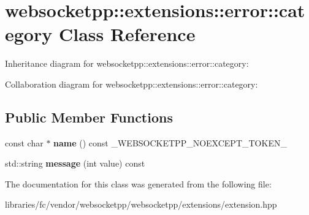 \hypertarget{classwebsocketpp_1_1extensions_1_1error_1_1category}{}\section{websocketpp\+:\+:extensions\+:\+:error\+:\+:category Class Reference}
\label{classwebsocketpp_1_1extensions_1_1error_1_1category}


Inheritance diagram for websocketpp\+:\+:extensions\+:\+:error\+:\+:category\+:


Collaboration diagram for websocketpp\+:\+:extensions\+:\+:error\+:\+:category\+:
\subsection*{Public Member Functions}
\begin{DoxyCompactItemize}
\item 
\mbox{\label{classwebsocketpp_1_1extensions_1_1error_1_1category_a862ad7d1a031d6bcfee5f654425215fd}} 
const char $\ast$ {\bfseries name} () const \+\_\+\+W\+E\+B\+S\+O\+C\+K\+E\+T\+P\+P\+\_\+\+N\+O\+E\+X\+C\+E\+P\+T\+\_\+\+T\+O\+K\+E\+N\+\_\+
\item 
\mbox{\label{classwebsocketpp_1_1extensions_1_1error_1_1category_a33bf4e8370bf9ba17b30e33a391788ae}} 
std\+::string {\bfseries message} (int value) const
\end{DoxyCompactItemize}


The documentation for this class was generated from the following file\+:\begin{DoxyCompactItemize}
\item 
libraries/fc/vendor/websocketpp/websocketpp/extensions/extension.\+hpp\end{DoxyCompactItemize}
